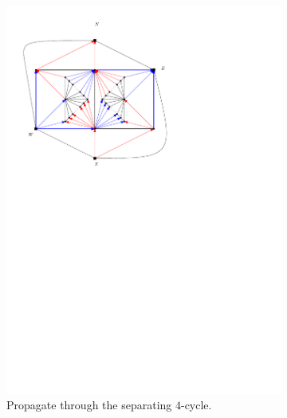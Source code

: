 \begin{figure}[h]
\begin{subfigure}[t]{0.3\textwidth}
      \includegraphics[width=\textwidth]{fixExtension/img/manymany2}
      \caption{Propagate through the separating $4$-cycle.}
      \label{fig:fix:manymany2}
    \end{subfigure}
    \quad
    \begin{subfigure}[t]{0.3\textwidth}

\end{subfigure}
\end{figure}
